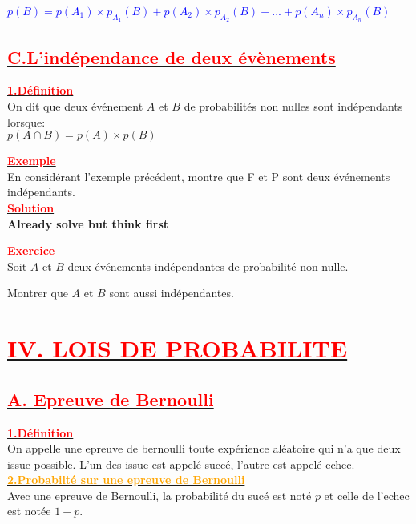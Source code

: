 \documentclass[12pt]{article}
\begin{document}
\textcolor{blue}{$p(B)=p(A_{1})\times p_{A_{1}}(B)+p(A_{2})\times p_{A_{2}}(B)+...+p(A_{n})\times p_{A_{n}}(B)$}
\subsection*{\underline{\textbf{\textcolor{red}{C.L'indépendance de deux évènements}}}}
\underline{\textbf{\textcolor{red}{1.Définition}}}\\
On dit que deux événement $A$ et $B$ de probabilités non nulles sont indépendants lorsque:\\
$p(A\cap B)=p(A)\times p(B)$

\underline{\textbf{\textcolor{red}{Exemple}}}\\
En considérant l'exemple précédent, montre que F et P sont deux événements indépendants.\\
\underline{\textbf{\textcolor{red}{Solution}}}\\
\textbf{Already solve but think first}

\underline{\textbf{\textcolor{red}{Exercice}}}\\
Soit $A$ et $B$ deux événements indépendantes de probabilité non nulle.

Montrer que $\overline{A}$ et $\overline{B}$ sont aussi indépendantes.
\section*{\underline{\textbf{\textcolor{red}{IV. LOIS DE PROBABILITE}}}}
\subsection*{\underline{\textbf{\textcolor{red}{A. Epreuve de Bernoulli}}}}
\underline{\textbf{\textcolor{red}{1.Définition}}}\\
On appelle une epreuve de bernoulli toute expérience aléatoire qui n'a que deux issue possible. L'un des issue est appelé succé, l'autre est appelé echec.
\underline{\textbf{\textcolor{orange}{2.Probabilté sur une epreuve de Bernoulli}}}\\
Avec une epreuve de Bernoulli, la probabilité du sucé est noté $p$ et celle de l'echec est notée $1-p$.
\end{document}
